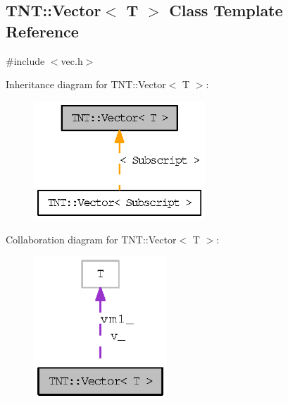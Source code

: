 \subsection{TNT::Vector$<$ T $>$ Class Template Reference}
\label{class_t_n_t_1_1_vector}


{\ttfamily \#include $<$vec.h$>$}



Inheritance diagram for TNT::Vector$<$ T $>$:
\nopagebreak
\begin{figure}[H]
\begin{center}
\leavevmode
\includegraphics[width=182pt]{class_t_n_t_1_1_vector__inherit__graph}
\end{center}
\end{figure}


Collaboration diagram for TNT::Vector$<$ T $>$:
\nopagebreak
\begin{figure}[H]
\begin{center}
\leavevmode
\includegraphics[width=142pt]{class_t_n_t_1_1_vector__coll__graph}
\end{center}
\end{figure}
